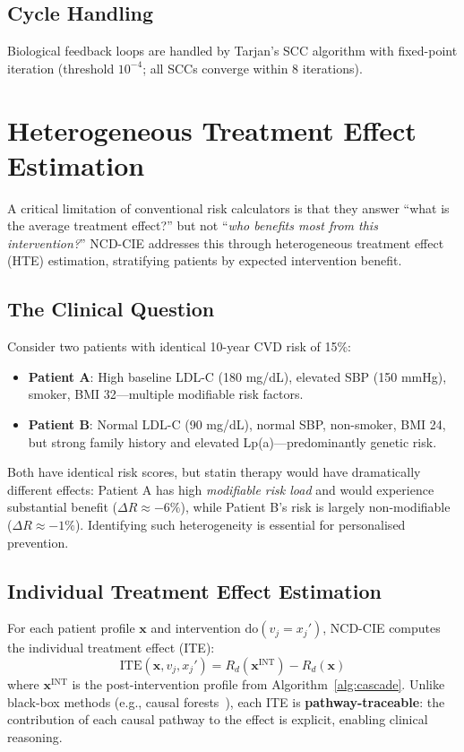 \documentclass[runningheads]{llncs}
\begin{document}
\subsection{Cycle Handling}\label{sec:cycles}

Biological feedback loops are handled by Tarjan's SCC algorithm
with fixed-point iteration (threshold $10^{-4}$; all SCCs converge
within 8 iterations).

\section{Heterogeneous Treatment Effect Estimation}\label{sec:hte}

A critical limitation of conventional risk calculators is that they
answer ``what is the average treatment effect?'' but not
``\emph{who benefits most from this intervention?}''
NCD-CIE addresses this through heterogeneous treatment effect (HTE)
estimation, stratifying patients by expected intervention benefit.

\subsection{The Clinical Question}

Consider two patients with identical 10-year CVD risk of 15\%:
\begin{itemize}
\item \textbf{Patient A}: High baseline LDL-C (180 mg/dL), elevated
  SBP (150 mmHg), smoker, BMI 32---multiple modifiable risk factors.
\item \textbf{Patient B}: Normal LDL-C (90 mg/dL), normal SBP,
  non-smoker, BMI 24, but strong family history and elevated Lp(a)---predominantly
  genetic risk.
\end{itemize}
Both have identical risk scores, but statin therapy would have
dramatically different effects: Patient A has high \emph{modifiable
risk load} and would experience substantial benefit ($\Delta R \approx -6\%$),
while Patient B's risk is largely non-modifiable ($\Delta R \approx -1\%$).
Identifying such heterogeneity is essential for personalised prevention.

\subsection{Individual Treatment Effect Estimation}\label{sec:ite}

For each patient profile $\mathbf{x}$ and intervention
$\mathrm{do}(v_j = x_j')$, NCD-CIE computes the individual treatment
effect (ITE):
\begin{equation}\label{eq:ite}
\mathrm{ITE}(\mathbf{x}, v_j, x_j') = R_d(\mathbf{x}^{\mathrm{INT}}) - R_d(\mathbf{x})
\end{equation}
where $\mathbf{x}^{\mathrm{INT}}$ is the post-intervention profile
from Algorithm~\ref{alg:cascade}.
Unlike black-box methods (e.g., causal forests~\cite{inoue2023causalforest}),
each ITE is \textbf{pathway-traceable}: the contribution of each
causal pathway to the effect is explicit, enabling clinical reasoning.
\end{document}
